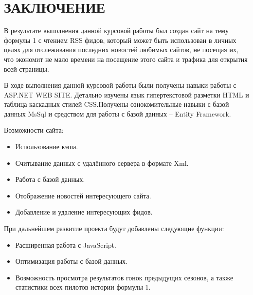 \documentclass[14pt,a4paper]{extreport}
\begin{document}
	\section*{\center\normalsize ЗАКЛЮЧЕНИЕ \endcenter}
	\flushleft\hspace{4ex}В результате выполнения данной курсовой работы был создан сайт на тему формулы 1 с чтением RSS фидов, который может быть использован в личных целях для отслеживания последних новостей любимых сайтов, не посещая их, что экономит не мало времени на посещение этого сайта и трафика для открытия всей страницы.\par
	\hspace{4ex}В ходе выполнения данной курсовой работы были получены навыки работы с ASP.NET WEB SITE. Детально изучены язык гипертекстовой разметки HTML и таблица каскадных стилей CSS.Получены ознокомительные навыки с базой данных MsSql и средством для работы с базой данных – Entity Framework.\par

\flushleft\hspace{4ex}Возможности сайта:\par
\begin {itemize} 
\item Использование кэша.

\item Считывание данных с удалённого сервера в формате Xml.

\item Работа с базой данных.

\item Отображение новостей интересующего сайта.

\item Добавление и удаление интересующих фидов.
\end {itemize} 

\flushleft\hspace{4ex} При дальнейшем развитие проекта будут добавлены следующие функции:\par

\begin {itemize}
\item Расширенная работа с JavaScript.

\item Оптимизация работы с базой данных.

\item  Возможность просмотра результатов гонок предыдущих сезонов, а также статистики всех пилотов истории формулы 1.
\end{itemize}
\end{document}
